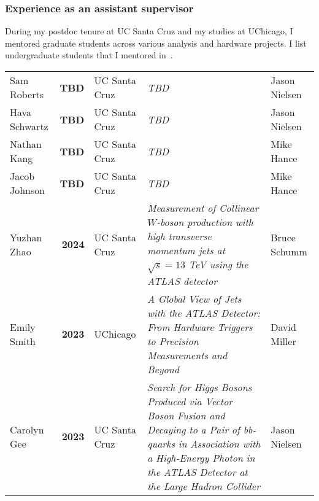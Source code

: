 \subsubsection{Experience as an assistant supervisor}\label{sssec:experience-as-an-assistant-supervisor}

During my postdoc tenure at UC Santa Cruz and my studies at UChicago, I mentored graduate students across various analysis and hardware projects. I list undergraduate students that I mentored in~.

{
\footnotesize
\begin{tabular}{l|>{\bfseries}r|l|>{\itshape}p{20em}|l}
	\centering
	Sam Roberts       & TBD  & UC Santa Cruz & TBD                                                                                                                                                                                      & Jason Nielsen \\
	Hava Schwartz     & TBD  & UC Santa Cruz & TBD                                                                                                                                                                                      & Jason Nielsen \\
	Nathan Kang       & TBD  & UC Santa Cruz & TBD                                                                                                                                                                                      & Mike Hance    \\
	Jacob Johnson     & TBD  & UC Santa Cruz & TBD                                                                                                                                                                                      & Mike Hance    \\
	Yuzhan Zhao       & 2024 & UC Santa Cruz & Measurement of Collinear $W$-boson production with high transverse momentum jets at $\sqrt{s} = 13$ TeV using the ATLAS detector                                                         & Bruce Schumm  \\
	Emily Smith       & 2023 & UChicago      & A Global View of Jets with the ATLAS Detector: From Hardware Triggers to Precision Measurements and Beyond                                                                               & David Miller  \\
	Carolyn Gee       & 2023 & UC Santa Cruz & Search for Higgs Bosons Produced via Vector Boson Fusion and Decaying to a Pair of bb-quarks in Association with a High-Energy Photon in the ATLAS Detector at the Large Hadron Collider & Jason Nielsen \\

\end{tabular}}
